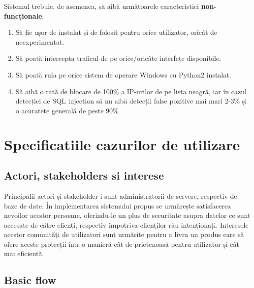 Sistemul trebuie, de asemenea, să aibă următoarele caracteristici \textbf{non-funcționale}:
\begin{enumerate}
	\item Să fie ușor de instalat și de folosit pentru orice utilizator, oricât de neexperimentat. 
	\item Să poată intercepta traficul de pe orice/oricâte interfețe disponibile. 
	\item Să poată rula pe orice sistem de operare Windows cu Python2 instalat. 
	\item Să aibă o rată de blocare de 100\% a IP-urilor de pe lista neagră, iar 
	în cazul detecției de SQL injection să nu aibă detecții false pozitive mai mari 2-3\% 
	și o acuratețe generală de peste 90\% 
\end{enumerate}
\newpage

\section{Specificatiile cazurilor de utilizare}

\subsection{Actori, stakeholders si interese}

Principalii actori și stakeholder-i sunt administratorii de servere, respectiv de baze de date. În implementarea sistemului propus se urmărește satisfacerea nevoilor acestor persoane, oferindu-le un plus de securitate asupra datelor ce sunt accesate de către clienți, respectiv împotriva clienților rău intenționați. Interesele acestor comunități de utilizatori sunt urmărite pentru a livra un produs care să ofere aceste protecții într-o manieră cât de prietenoasă pentru utilizator și cât mai eficientă. 

\subsection{Basic flow}

